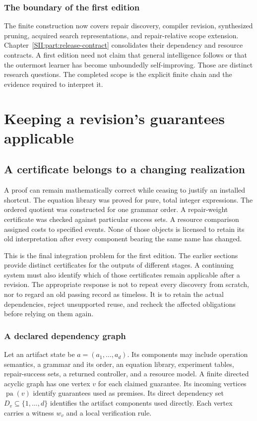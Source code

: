 \subsection{The boundary of the first edition}
The finite construction now covers repair discovery, compiler revision, synthesized pruning, acquired search representations, and repair-relative scope extension. Chapter~\ref{SII:part:release-contract} consolidates their dependency and resource contracts. A first edition need not claim that general intelligence follows or that the outermost learner has become unboundedly self-improving. Those are distinct research questions. The completed scope is the explicit finite chain and the evidence required to interpret it.


\chapter{Keeping a revision's guarantees applicable}\label{SII:book:chapter-64}
\label{SII:part:release-contract}
\section{A certificate belongs to a changing realization}\label{SII:sec:certificate-life}
A proof can remain mathematically correct while ceasing to justify an installed shortcut. The equation library was proved for pure, total integer expressions. The ordered quotient was constructed for one grammar order. A repair-weight certificate was checked against particular success sets. A resource comparison assigned costs to specified events. None of those objects is licensed to retain its old interpretation after every component bearing the same name has changed.

This is the final integration problem for the first edition. The earlier sections provide distinct certificates for the outputs of different stages. A continuing system must also identify which of those certificates remain applicable after a revision. The appropriate response is not to repeat every discovery from scratch, nor to regard an old passing record as timeless. It is to retain the actual dependencies, reject unsupported reuse, and recheck the affected obligations before relying on them again.

\subsection{A declared dependency graph}
Let an artifact state be $a=(a_1,\ldots,a_d)$. Its components may include operation semantics, a grammar and its order, an equation library, experiment tables, repair-success sets, a returned controller, and a resource model. A finite directed acyclic graph has one vertex $v$ for each claimed guarantee. Its incoming vertices $\operatorname{pa}(v)$ identify guarantees used as premises. Its direct dependency set $D_v\subseteq\{1,\ldots,d\}$ identifies the artifact components used directly. Each vertex carries a witness $w_v$ and a local verification rule.

